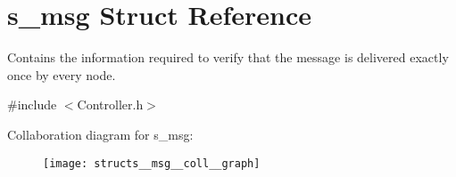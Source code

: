 \hypertarget{structs__msg}{}\section{s\+\_\+msg Struct Reference}
\label{structs__msg}


Contains the information required to verify that the message is delivered exactly once by every node.  




{\ttfamily \#include $<$Controller.\+h$>$}



Collaboration diagram for s\+\_\+msg\+:
\nopagebreak
\begin{figure}[H]
\begin{center}
\leavevmode
\texttt{[image: structs\_\_msg\_\_coll\_\_graph]}
\end{center}
\end{figure}
